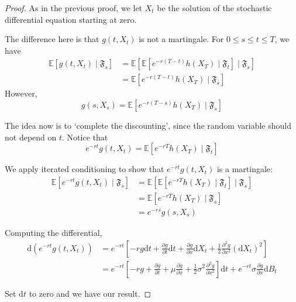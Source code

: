 \begin{proof}
    As in the previous proof, we let $X_t$ be the solution of the stochastic differential equation starting at zero.

    The difference here is that $g(t, X_t)$ is not a martingale. For $0 \le s \le t \le T$, we have 
    \begin{equation*}
        \begin{aligned}
            \mathbb{E}[g(t, X_t) \mid \mathfrak{F}_s] &= \mathbb{E}[\mathbb{E}[e^{-r(T-t)} h(X_T) \mid \mathfrak{F}_t] \mid \mathfrak{F}_s] \\
            &= \mathbb{E}[e^{-r(T-t)} h(X_T) \mid \mathfrak{F}_s]
        \end{aligned}
    \end{equation*}
    However,
    \begin{equation*}
        g(s, X_s) = \mathbb{E}[e^{-r(T-s)} h(X_T) \mid \mathfrak{F}_s]
    \end{equation*}
    
    The idea now is to `complete the discounting', since the random variable should not depend on $t$. Notice that 
    \begin{equation*}
        e^{-rt} g(t, X_t) = \mathbb{E}[e^{-rT} h(X_T) \mid \mathfrak{F}_t]
    \end{equation*}

    We apply iterated conditioning to show that $e^{-rt} g(t, X_t)$ is a martingale:
    \begin{equation*}
        \begin{aligned}
            \mathbb{E}[e^{-rt} g(t, X_t) \mid \mathfrak{F}_s] &= \mathbb{E}[\mathbb{E}[e^{-rT} h(X_T) \mid \mathfrak{F}_t] \mid \mathfrak{F}_s] \\
            &= \mathbb{E}[e^{-rT} h(X_T) \mid \mathfrak{F}_s] \\
            &= e^{-rs}g(s, X_s)
        \end{aligned}
    \end{equation*}

    Computing the differential,
    \begin{equation*}
        \begin{aligned}
            \mathrm{d}(e^{-rt} g(t, X_t)) &= e^{-rt} \left[ -r g \mathrm{d}t + \frac{\partial g}{\partial t} \mathrm{d}t + \frac{\partial g}{\partial x} \mathrm{d}X_t + \frac{1}{2} \frac{\partial^2 g}{\partial x^2} (\mathrm{d}X_t)^2 \right] \\
            &= e^{-rt}\left[ -r g + \frac{\partial g}{\partial t} + \mu \frac{\partial g}{\partial x} + \frac{1}{2} \sigma^2 \frac{\partial^2 g}{\partial x^2} \right] \mathrm{d}t + e^{-rt} \sigma \frac{\partial g}{\partial x} \mathrm{d}B_t
        \end{aligned}
    \end{equation*}

    Set $\mathrm{d}t$ to zero and we have our result.
\end{proof}

